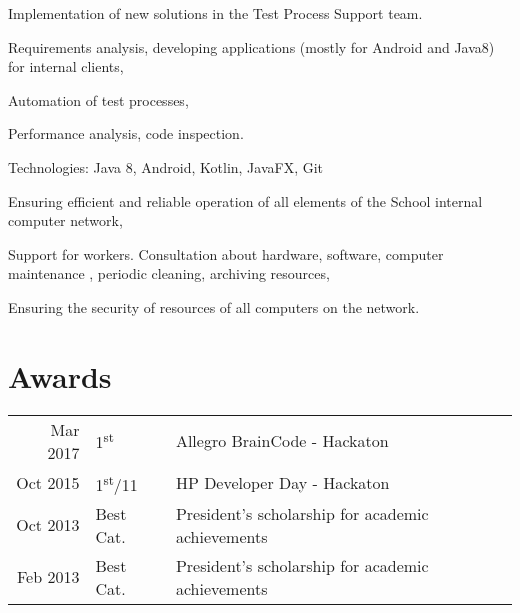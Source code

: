 \documentclass[]{deedy-resume-openfont}
\begin{document}
\begin{minipage}[t]{0.66\textwidth}
Implementation of new solutions in the Test Process Support team.
\begin{tightemize}
\item Requirements analysis, developing applications (mostly for Android and Java8) for internal clients,
\item Automation of test processes,
\item Performance analysis, code inspection.
\end{tightemize}
Technologies: Java 8, Android, Kotlin, JavaFX, Git
\sectionsep

\begin{tightemize}
\item Ensuring efficient and reliable operation of all elements of the School internal computer network,
\item Support for workers. Consultation about hardware, software, computer maintenance , periodic cleaning, archiving resources, 
\item Ensuring the security of resources of all computers on the network.
\end{tightemize}
\sectionsep


 \section{Awards} 
 \begin{tabular}{rll}
 Mar 2017	     & 1\textsuperscript{st}     & Allegro BrainCode - Hackaton \\
 Oct 2015	     & 1\textsuperscript{st}/11  & HP Developer Day  - Hackaton\\
 Oct 2013	     & Best Cat.  & President’s scholarship for academic achievements \\
 Feb 2013	     & Best Cat.  & President’s scholarship for academic achievements \\
 \end{tabular}
 \sectionsep

\end{minipage} 
\end{document}
